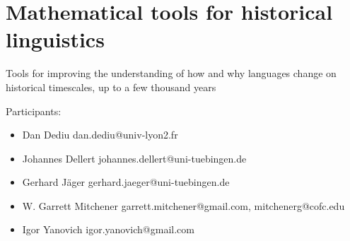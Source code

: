 
\section{Mathematical tools for historical linguistics}

Tools for improving the understanding of how and why languages change on historical timescales, up to a few thousand years

Participants:
\begin{itemize}
\item Dan Dediu dan.dediu@univ-lyon2.fr
\item Johannes Dellert johannes.dellert@uni-tuebingen.de
\item Gerhard Jäger gerhard.jaeger@uni-tuebingen.de
\item W. Garrett Mitchener garrett.mitchener@gmail.com, mitchenerg@cofc.edu
\item Igor Yanovich igor.yanovich@gmail.com
\end{itemize}

